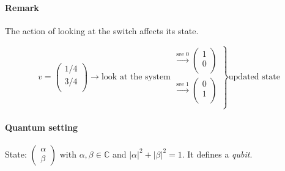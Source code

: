 \documentclass{article}
\begin{document}
\paragraph{Remark}
The action of looking at the switch affects its state.

\[v=
\begin{pmatrix}
1/4\\
3/4\\
\end{pmatrix}
\to \text{look at the system}
\left.
\begin{matrix}
\overset{\text{see 0}}{\to}
\begin{pmatrix}
1\\ 0\\
\end{pmatrix}\\
\overset{\text{see 1}}{\to}
\begin{pmatrix}
0\\ 1\\
\end{pmatrix}\\
\end{matrix}
\right\} \text{updated state}
\]

\paragraph{Quantum setting}
State: $\begin{pmatrix}
\alpha \\ \beta
\end{pmatrix}$ with $\alpha, \beta \in \mathbb{C}$ and $|\alpha|^2 + |\beta|^2 = 1$. It defines a \emph{qubit}.
\end{document}
